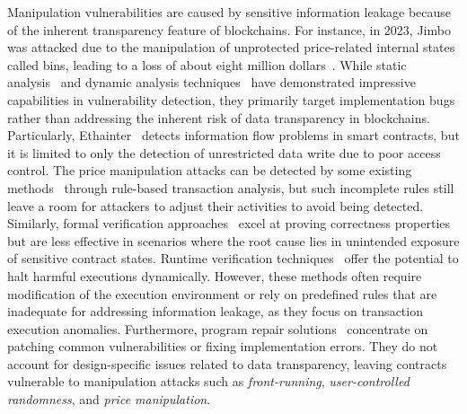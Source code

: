 Manipulation vulnerabilities are caused by sensitive information leakage because of the inherent transparency feature of blockchains.
For instance, in 2023, Jimbo was attacked due to the manipulation of unprotected price-related internal states called bins, leading to a loss of about eight million dollars~\cite{Jimbo}.
While static analysis~\cite{luu2016making,securify,tikhomirov2018smartcheck,brent2020ethainter,feng2019precise,sun2024gptscan} and dynamic analysis techniques~\cite{2018contractfuzzer,nguyen2020sfuzz,echidna,xie2024defort,wu2023defiranger,kong2023defitainter} have demonstrated impressive capabilities in vulnerability detection, they primarily target implementation bugs rather than addressing the inherent risk of data transparency in blockchains. 
Particularly, Ethainter~\cite{brent2020ethainter} detects information flow problems in smart contracts, but it is limited to only the detection of unrestricted data write due to poor access control.
The price manipulation attacks can be detected by some existing methods~\cite{xie2024defort,wu2023defiranger,kong2023defitainter} through rule-based transaction analysis, but such incomplete rules still leave a room for attackers to adjust their activities to avoid being detected.
Similarly, formal verification approaches~\cite{manticore,mythril,liu2024propertygpt,Certora,hildenbrandt2018kevm} excel at proving correctness properties but are less effective in scenarios where the root cause lies in unintended exposure of sensitive contract states.
Runtime verification techniques~\cite{magazzeni2017validation, rodler2018sereum, li2020securing, chen2024demystifying} offer the potential to halt harmful executions dynamically. However, these methods often require modification of the execution environment or rely on predefined rules that are inadequate for addressing information leakage, as they focus on transaction execution anomalies. Furthermore, program repair solutions~\cite{yu2020smart, so2023smartfix, nguyen2021sguard, gao2024sguard+, zhang2024acfix, tolmach2022property, zhang2020smartshield, jin2021aroc} concentrate on patching common vulnerabilities or fixing implementation errors. They do not account for design-specific issues related to data transparency, leaving contracts vulnerable to manipulation attacks such as \textit{front-running}, \textit{user-controlled randomness}, and \textit{price manipulation}. 

